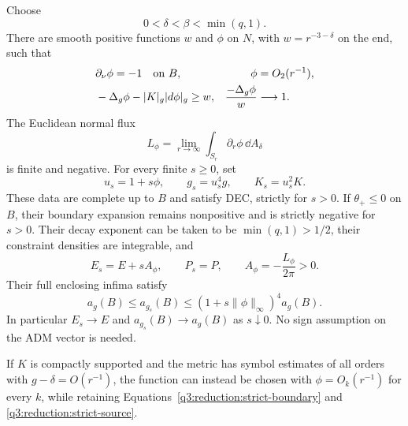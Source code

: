 \begin{lemma}
\label{q3:reduction:strict-direction}
Choose
\[
 0<\delta<\beta<\min(q,1).
\]
There are smooth positive functions $w$ and $\phi$ on $N$, with
$w=r^{-3-\delta}$ on the end, such that
\begin{align}
 &\partial_\nu\phi=-1\quad\hbox{on }B,
       &\phi&=O_2(r^{-1}),\label{q3:reduction:strict-boundary}\\
 &-\Delta_g\phi-|K|_g|d\phi|_g\ge w,
       &\frac{-\Delta_g\phi}{w}&\longrightarrow1.
       \label{q3:reduction:strict-source}
\end{align}
The Euclidean normal flux
\[
 L_\phi=\lim_{r\to\infty}
          \int_{S_r}\partial_r\phi\,\dd A_\delta
\]
is finite and negative.  For every finite $s\ge0$, set
\begin{equation}
 \label{q3:reduction:linear-family}
 u_s=1+s\phi,\qquad g_s=u_s^4g,\qquad K_s=u_s^2K.
\end{equation}
These data are complete up to $B$ and satisfy DEC, strictly for $s>0$.
If $\theta_+\le0$ on $B$, their boundary expansion remains nonpositive
and is strictly negative for $s>0$.  Their decay exponent can be taken to be
$\min(q,1)>1/2$, their constraint densities are integrable, and
\begin{equation}
 \label{q3:reduction:strict-charges}
 E_s=E+sA_\phi,\qquad P_s=P,
 \qquad A_\phi=-\frac{L_\phi}{2\pi}>0.
\end{equation}
Their full enclosing infima satisfy
\begin{equation}
 \label{q3:reduction:strict-areas}
 a_g(B)\le a_{g_s}(B)
       \le (1+s\|\phi\|_\infty)^4a_g(B).
\end{equation}
In particular $E_s\to E$ and $a_{g_s}(B)\to a_g(B)$ as $s\downarrow0$.
No sign assumption on the ADM vector is needed.

If $K$ is compactly supported and the metric has symbol estimates of all
orders with $g-\delta=O(r^{-1})$, the function can instead be chosen with
$\phi=O_k(r^{-1})$ for every $k$, while retaining
Equations~\eqref{q3:reduction:strict-boundary} and
\eqref{q3:reduction:strict-source}.
\end{lemma}

